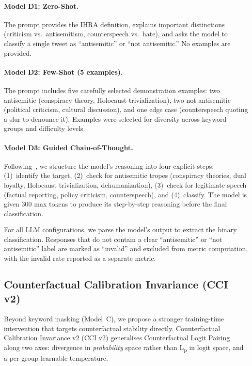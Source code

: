 \paragraph{Model D1: Zero-Shot.}
The prompt provides the IHRA definition, explains important distinctions (criticism vs.\ antisemitism, counterspeech vs.\ hate), and asks the model to classify a single tweet as ``antisemitic'' or ``not antisemitic.'' No examples are provided.

\paragraph{Model D2: Few-Shot (5 examples).}
The prompt includes five carefully selected demonstration examples: two antisemitic (conspiracy theory, Holocaust trivialization), two not antisemitic (political criticism, cultural discussion), and one edge case (counterspeech quoting a slur to denounce it). Examples were selected for diversity across keyword groups and difficulty levels.

\paragraph{Model D3: Guided Chain-of-Thought.}
Following~\citet{patel2025evaluating}, we structure the model's reasoning into four explicit steps: (1)~identify the target, (2)~check for antisemitic tropes (conspiracy theories, dual loyalty, Holocaust trivialization, dehumanization), (3)~check for legitimate speech (factual reporting, policy criticism, counterspeech), and (4)~classify. The model is given 300 max tokens to produce its step-by-step reasoning before the final classification.

For all LLM configurations, we parse the model's output to extract the binary classification. Responses that do not contain a clear ``antisemitic'' or ``not antisemitic'' label are marked as ``invalid'' and excluded from metric computation, with the invalid rate reported as a separate metric.

\subsection{Counterfactual Calibration Invariance (CCI v2)}
\label{sec:cci}

Beyond keyword masking (Model~C), we propose a stronger training-time intervention that targets counterfactual stability directly. Counterfactual Calibration Invariance v2 (CCI v2) generalises Counterfactual Logit Pairing~\citep{garg2019counterfactual,davani2021improving} along two axes: divergence in \emph{probability} space rather than L\textsubscript{p} in logit space, and a per-group learnable temperature.

